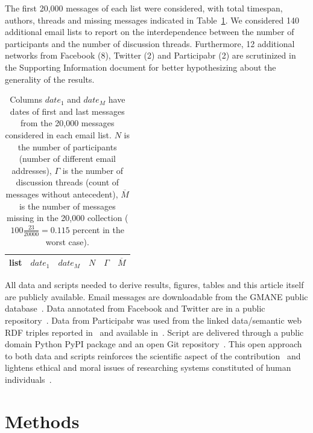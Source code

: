 \documentclass[%
	aip,
	jmp,%
	amsmath,amssymb,
	reprint,%
]{revtex4-1}
\begin{document}
The first 20,000 messages of each list were considered, with total timespan, authors, threads and missing messages indicated in Table~\ref{tab:genLists}.
We considered 140 additional email lists to
report on the interdependence between the number of participants and 
the number of discussion threads.
Furthermore, 12 additional networks from Facebook (8), Twitter (2) and Participabr (2)
are scrutinized in the Supporting Information document for better hypothesizing
about the generality of the results.

\begin{table}
	\centering
	\caption{Columns $date_1$ and $date_M$ have dates of first and last messages from the 20,000 messages considered in each email list.
		$N$ is the number of participants (number of different email addresses),
		$\Gamma$ is the number of discussion threads (count of messages without antecedent),
		$\overline{M}$ is the number of messages missing in the 20,000 collection
		($100\frac{23}{20000}=0.115$ percent in the worst case).
	}
	\label{tab:genLists}
	\begin{tabular}{|l|c|c|c|c|c|}\hline
		list & $date_1$ & $date_{M}$    & $N$  & $\Gamma$ & $\overline{M}$ \\\hline
		
	\end{tabular}
\end{table}

All data and scripts needed to derive results, figures, tables and this article itself
are publicly available.
Email messages are downloadable from the GMANE public database~\cite{GMANEwikipedia}.
Data annotated from Facebook and Twitter are in a public repository~\cite{fbtwData}.
Data from Participabr was used from the linked data/semantic web RDF triples
reported in~\cite{opa} and available in~\cite{datahub}.
Script are delivered through a public domain Python PyPI package and
an open Git repository~\cite{gmanePack}.
This open approach to both data and scripts
reinforces the scientific aspect of the contribution~\cite{openSci}
and lightens ethical and moral issues of researching 
systems constituted of
human individuals~\cite{anPhy,ccs15}.

\section{Methods}\label{sec:carac}
\end{document}
